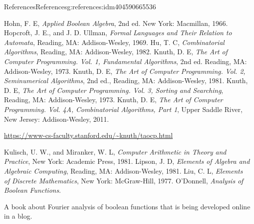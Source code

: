 \documentclass[twoside,10pt,]{book}
\numberwithin{equation}{section}
\begin{document}
\begin{references-chapter-numberless}{References}{}{References}{}{}{g:references:idm404590665536}
\begin{referencelist}
\label{x:biblio:biblio-hohn-1966}{}\hypertarget{x:biblio:biblio-hohn-1966}{}Hohn, F. E, \textit{Applied Boolean Algebra}, 2nd ed. New York: Macmillan, 1966.
\label{x:biblio:biblio-hopcroft-1969}{}\hypertarget{x:biblio:biblio-hopcroft-1969}{}Hopcroft, J. E., and J. D. Ullman,  \textit{Formal Languages and Their Relation to Automata}, Reading, MA: Addison-Wesley, 1969.
\label{x:biblio:biblio-hu-1982}{}\hypertarget{x:biblio:biblio-hu-1982}{}Hu, T. C, \textit{Combinatorial Algorithms}, Reading, MA: Addison-Wesley, 1982.
\label{x:biblio:biblio-knuth-1978}{}\hypertarget{x:biblio:biblio-knuth-1978}{}Knuth, D. E, \textit{The Art of Computer Programming. Vol. 1, Fundamental Algorithms}, 2nd ed. Reading, MA: Addison-Wesley, 1973.
\label{x:biblio:biblio-knuth-1981}{}\hypertarget{x:biblio:biblio-knuth-1981}{}Knuth, D. E, \textit{The Art of Computer Programming. Vol. 2, Seminumerical Algorithms}, 2nd ed., Reading, MA: Addison-Wesley, 1981.
\label{x:biblio:biblio-knuth-1973}{}\hypertarget{x:biblio:biblio-knuth-1973}{}Knuth, D. E, \textit{The Art of Computer Programming. Vol. 3, Sorting and Searching}, Reading, MA: Addison-Wesley, 1973.
\label{x:biblio:biblio-knuth-2011}{}\hypertarget{x:biblio:biblio-knuth-2011}{}Knuth, D. E, \textit{The Art of Computer Programming. Vol. 4A, Combinatorial Algorithms, Part 1}, Upper Saddle River, New Jersey: Addison-Wesley, 2011.\par%
\href{https://www-cs-faculty.stanford.edu/\~knuth/taocp.html}{https:\slash{}\slash{}www-cs-faculty.stanford.edu\slash{}\textasciitilde{}knuth\slash{}taocp.html}%

\label{x:biblio:biblio-kulisch-1981}{}\hypertarget{x:biblio:biblio-kulisch-1981}{}Kulisch, U. W., and Miranker, W. L, \textit{Computer Arithmetic in Theory and Practice}, New York: Academic Press, 1981.
\label{x:biblio:biblio-lipson-1981}{}\hypertarget{x:biblio:biblio-lipson-1981}{}Lipson, J. D, \textit{Elements of Algebra and Algebraic Computing}, Reading, MA: Addison-Wesley, 1981.
\label{x:biblio:biblio-liu-1977}{}\hypertarget{x:biblio:biblio-liu-1977}{}Liu, C. L, \textit{Elements of Discrete Mathematics}, New York: McGraw-Hill, 1977.
\label{x:biblio:biblio-odonnell-2019}{}\hypertarget{x:biblio:biblio-odonnell-2019}{}O'Donnell, \textit{Analysis of Boolean Functions}. \par%
A book about Fourier analysis of boolean functions that is being developed online in a blog.%


\end{referencelist}
\end{references-chapter-numberless}
\end{document}
